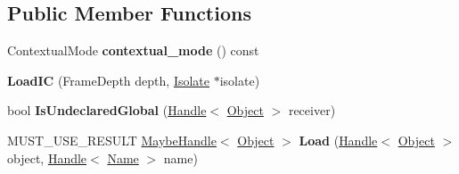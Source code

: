 \subsection*{Public Member Functions}
\begin{DoxyCompactItemize}
\item 
\hypertarget{classv8_1_1internal_1_1_load_i_c_ab4960460d46cf59a0eeafd854a386301}{}Contextual\+Mode {\bfseries contextual\+\_\+mode} () const \label{classv8_1_1internal_1_1_load_i_c_ab4960460d46cf59a0eeafd854a386301}

\item 
\hypertarget{classv8_1_1internal_1_1_load_i_c_a713e5d3acdc45dfb4bd192b4f3da4622}{}{\bfseries Load\+I\+C} (Frame\+Depth depth, \hyperlink{classv8_1_1internal_1_1_isolate}{Isolate} $\ast$isolate)\label{classv8_1_1internal_1_1_load_i_c_a713e5d3acdc45dfb4bd192b4f3da4622}

\item 
\hypertarget{classv8_1_1internal_1_1_load_i_c_afa5d065e1487ede8a8837d10dc23f2c2}{}bool {\bfseries Is\+Undeclared\+Global} (\hyperlink{classv8_1_1internal_1_1_handle}{Handle}$<$ \hyperlink{classv8_1_1internal_1_1_object}{Object} $>$ receiver)\label{classv8_1_1internal_1_1_load_i_c_afa5d065e1487ede8a8837d10dc23f2c2}

\item 
\hypertarget{classv8_1_1internal_1_1_load_i_c_a6f5824f411ac14f831a09a11e20c85b3}{}M\+U\+S\+T\+\_\+\+U\+S\+E\+\_\+\+R\+E\+S\+U\+L\+T \hyperlink{classv8_1_1internal_1_1_maybe_handle}{Maybe\+Handle}$<$ \hyperlink{classv8_1_1internal_1_1_object}{Object} $>$ {\bfseries Load} (\hyperlink{classv8_1_1internal_1_1_handle}{Handle}$<$ \hyperlink{classv8_1_1internal_1_1_object}{Object} $>$ object, \hyperlink{classv8_1_1internal_1_1_handle}{Handle}$<$ \hyperlink{classv8_1_1internal_1_1_name}{Name} $>$ name)\label{classv8_1_1internal_1_1_load_i_c_a6f5824f411ac14f831a09a11e20c85b3}

\end{DoxyCompactItemize}
